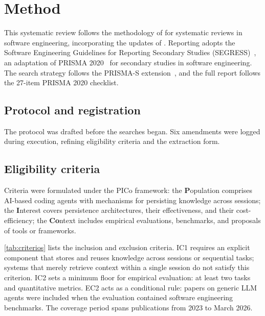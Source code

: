 \section{Method}
\label{sec:metodo}

This systematic review follows the methodology of
\citet{kitchenham2007guidelines} for systematic reviews in software
engineering, incorporating the updates of
\citet{kitchenham2013systematic}.
Reporting adopts the Software Engineering Guidelines for Reporting
Secondary Studies (SEGRESS)~\citep{kitchenham2023segress}, an adaptation
of PRISMA 2020~\citep{page2021prisma} for secondary studies in software
engineering.
The search strategy follows the PRISMA-S
extension~\citep{rethlefsen2021prismas}, and the full report follows the
27-item PRISMA 2020 checklist.

\subsection{Protocol and registration}
\label{sec:protocolo}

The protocol was drafted before the searches began.
Six amendments were logged during execution, refining eligibility
criteria and the extraction form.

\subsection{Eligibility criteria}
\label{sec:criterios}

Criteria were formulated under the PICo framework:
the \textbf{P}opulation comprises AI-based coding agents with mechanisms
for persisting knowledge across sessions;
the \textbf{I}nterest covers persistence architectures, their
effectiveness, and their cost-efficiency;
the \textbf{Co}ntext includes empirical evaluations, benchmarks, and
proposals of tools or frameworks.

\autoref{tab:criterios} lists the inclusion and exclusion criteria.
IC1 requires an explicit component that stores and reuses knowledge
across sessions or sequential tasks;
systems that merely retrieve context within a single session do not
satisfy this criterion.
IC2 sets a minimum floor for empirical evaluation: at least two tasks
and quantitative metrics.
EC2 acts as a conditional rule: papers on generic LLM agents were
included when the evaluation contained software engineering benchmarks.
The coverage period spans publications from 2023 to March 2026.

